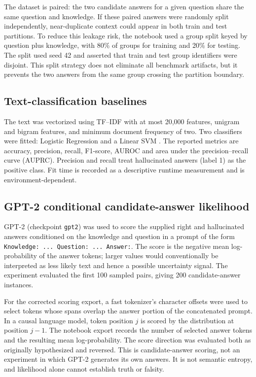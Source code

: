 \documentclass[acmsmall,nonacm]{acmart}
\begin{document}
The dataset is paired: the two candidate answers for a given question share the same question and knowledge. If these paired answers were randomly split independently, near-duplicate context could appear in both train and test partitions. To reduce this leakage risk, the notebook used a group split keyed by question plus knowledge, with 80\% of groups for training and 20\% for testing. The split used seed 42 and asserted that train and test group identifiers were disjoint. This split strategy does not eliminate all benchmark artifacts, but it prevents the two answers from the same group crossing the partition boundary.

\subsection{Text-classification baselines}
The text was vectorized using TF--IDF \citep{sparckjones1972statistical} with at most 20,000 features, unigram and bigram features, and minimum document frequency of two. Two classifiers were fitted: Logistic Regression and a Linear SVM \citep{cortes1995support}. The reported metrics are accuracy, precision, recall, F1-score, AUROC and area under the precision--recall curve (AUPRC). Precision and recall treat hallucinated answers (label 1) as the positive class. Fit time is recorded as a descriptive runtime measurement and is environment-dependent.

\subsection{GPT-2 conditional candidate-answer likelihood}
GPT-2 \citep{radford2019language} (checkpoint \texttt{gpt2}) was used to score the supplied right and hallucinated answers conditioned on the knowledge and question in a prompt of the form \texttt{Knowledge: ... Question: ... Answer:}. The score is the negative mean log-probability of the answer tokens; larger values would conventionally be interpreted as less likely text and hence a possible uncertainty signal. The experiment evaluated the first 100 sampled pairs, giving 200 candidate-answer instances.

For the corrected scoring export, a fast tokenizer's character offsets were used to select tokens whose spans overlap the answer portion of the concatenated prompt. In a causal language model, token position $j$ is scored by the distribution at position $j-1$. The notebook export records the number of selected answer tokens and the resulting mean log-probability. The score direction was evaluated both as originally hypothesized and reversed. This is candidate-answer scoring, not an experiment in which GPT-2 generates its own answers. It is not semantic entropy, and likelihood alone cannot establish truth or falsity.
\end{document}
